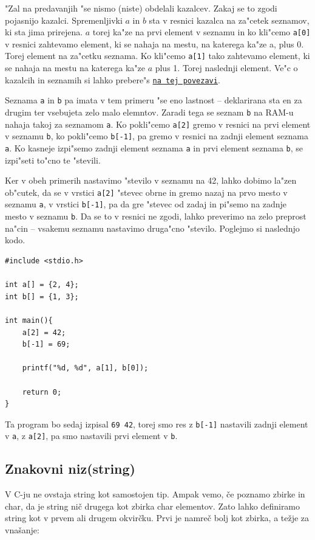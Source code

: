 \documentclass[a4paper, 12pt]{article}
\begin{document}
"Zal na predavanjih "se nismo (niste) obdelali kazalcev. Zakaj se to zgodi pojasnijo kazalci. Spremenljivki $a$ in $b$ sta v resnici kazalca na za"cetek seznamov, ki sta jima prirejena. $a$ torej ka"ze na prvi element v seznamu in ko kli"cemo \lstinline|a[0]| v resnici zahtevamo element, ki se nahaja na mestu, na katerega ka"ze a, plus 0. Torej element na za"cetku seznama. Ko kli"cemo \lstinline|a[1]| tako zahtevamo element, ki se nahaja na mestu na katerega ka"ze $a$ plus 1. Torej naslednji element. Ve"c o kazalcih in seznamih si lahko prebere"s  \href{https://github.com/DzinVision/c-uvod}{\texttt{na tej povezavi}}.

Seznama  \lstinline|a| in \lstinline|b| pa imata v tem primeru "se eno lastnost -- deklarirana sta en za drugim ter vsebujeta zelo malo elemntov. Zaradi tega se seznam \lstinline|b| na RAM-u nahaja takoj za seznamom \lstinline|a|. Ko pokli"cemo \lstinline|a[2]| gremo v resnici na prvi element v seznamu \texttt{b}, ko pokli"cemo \lstinline|b[-1]|, pa gremo v resnici na zadnji element seznama \texttt{a}. Ko kasneje izpi"semo zadnji element seznama \texttt{a} in prvi element seznama \texttt{b}, se izpi"seti to"cno te "stevili. 

Ker v obeh primerih nastavimo "stevilo v seznamu na 42, lahko dobimo la"zen ob"cutek, da se v vrstici \lstinline|a[2]| "stevec obrne in gremo nazaj na prvo mesto v seznamu \texttt{a}, v vrstici \lstinline|b[-1]|, pa da gre "stevec od zadaj in pi"semo na zadnje mesto v seznamu \texttt{b}. Da se to v resnici ne zgodi, lahko preverimo na zelo preprost na"cin -- vsakemu seznamu nastavimo druga"cno "stevilo. Poglejmo si naslednjo kodo.

\begin{lstlisting}
#include <stdio.h>

int a[] = {2, 4};
int b[] = {1, 3};

int main(){
	a[2] = 42;
	b[-1] = 69;

	printf("%d, %d", a[1], b[0]);

	return 0;
}
\end{lstlisting}

Ta program bo sedaj izpisal \texttt{69 42}, torej smo res z \lstinline|b[-1]| nastavili zadnji element v \texttt{a}, z \lstinline|a[2]|, pa smo nastavili prvi element v \texttt{b}.
%
\subsection{Znakovni niz(string)}
V C-ju ne ovstaja string kot samostojen tip. Ampak vemo, če poznamo zbirke in char, da je string nič drugega kot zbirka char elementov. Zato lahko definiramo string kot v prvem ali drugem okvirčku. Prvi je namreč bolj kot zbirka, a težje za vnašanje:
\begin{center}
\end{center}
\end{document}
